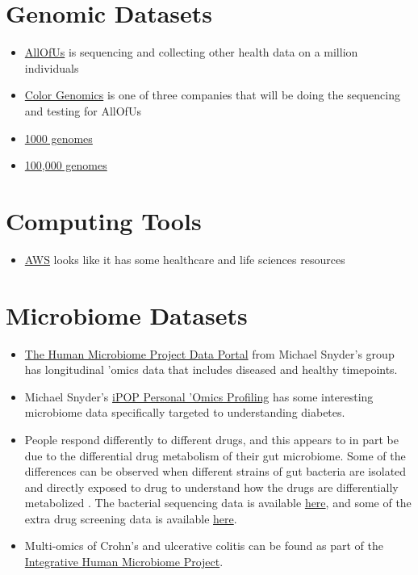 \documentclass[]{book}
\providecommand{\tightlist}{%
  \setlength{\itemsep}{0pt}\setlength{\parskip}{0pt}}
\begin{document}
\section{Genomic Datasets}\label{genomic-datasets}

\begin{itemize}
\tightlist
\item
  \href{ttps://www.joinallofus.org/en/how-to-join}{AllOfUs} is
  sequencing and collecting other health data on a million individuals
\item
  \href{https://www.color.com/}{Color Genomics} is one of three
  companies that will be doing the sequencing and testing for AllOfUs
\item
  \href{http://www.internationalgenome.org/data/}{1000 genomes}
\item
  \href{https://www.genomicsengland.co.uk/}{100,000 genomes}
\end{itemize}

\section{Computing Tools}\label{computing-tools}

\begin{itemize}
\tightlist
\item
  \href{https://aws.amazon.com/health/}{AWS} looks like it has some
  healthcare and life sciences resources
\end{itemize}

\section{Microbiome Datasets}\label{microbiome-datasets}

\begin{itemize}
\tightlist
\item
  \href{https://portal.hmpdacc.org/}{The Human Microbiome Project Data
  Portal} from Michael Snyder's group has longitudinal 'omics data that
  includes diseased and healthy timepoints.
\item
  Michael Snyder's \href{http://med.stanford.edu/ipop.html}{iPOP
  Personal 'Omics Profiling} has some interesting microbiome data
  specifically targeted to understanding diabetes.
\item
  People respond differently to different drugs, and this appears to in
  part be due to the differential drug metabolism of their gut
  microbiome. Some of the differences can be observed when different
  strains of gut bacteria are isolated and directly exposed to drug to
  understand how the drugs are differentially metabolized
  \citep{zimmermann2019mapping}. The bacterial sequencing data is
  available
  \href{https://www.ebi.ac.uk/ena/data/search?query=PRJEB31790}{here},
  and some of the extra drug screening data is available
  \href{https://figshare.com/articles/Mapping_human_microbiome_drug_metabolism_by_gut_bacteria_and_their_genes/8119058}{here}.
\item
  Multi-omics of Crohn's and ulcerative colitis can be found as part of
  the \href{https://www.ibdmdb.org/}{Integrative Human Microbiome
  Project}.
\end{itemize}
\end{document}
